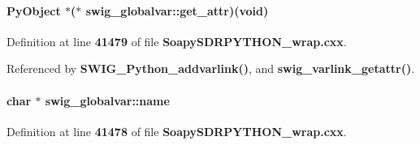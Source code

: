 \paragraph[{get\+\_\+attr}]{\setlength{\rightskip}{0pt plus 5cm}Py\+Object $\ast$($\ast$ swig\+\_\+globalvar\+::get\+\_\+attr)({\bf void})}\label{structswig__globalvar_a493a5974e1e2509ba48001f1a53d26ae}


Definition at line {\bf 41479} of file {\bf Soapy\+S\+D\+R\+P\+Y\+T\+H\+O\+N\+\_\+wrap.\+cxx}.



Referenced by {\bf S\+W\+I\+G\+\_\+\+Python\+\_\+addvarlink()}, and {\bf swig\+\_\+varlink\+\_\+getattr()}.

\paragraph[{name}]{\setlength{\rightskip}{0pt plus 5cm}char $\ast$ swig\+\_\+globalvar\+::name}\label{structswig__globalvar_afbf8fc90fadf3be87612f68d2af889f7}


Definition at line {\bf 41478} of file {\bf Soapy\+S\+D\+R\+P\+Y\+T\+H\+O\+N\+\_\+wrap.\+cxx}.



